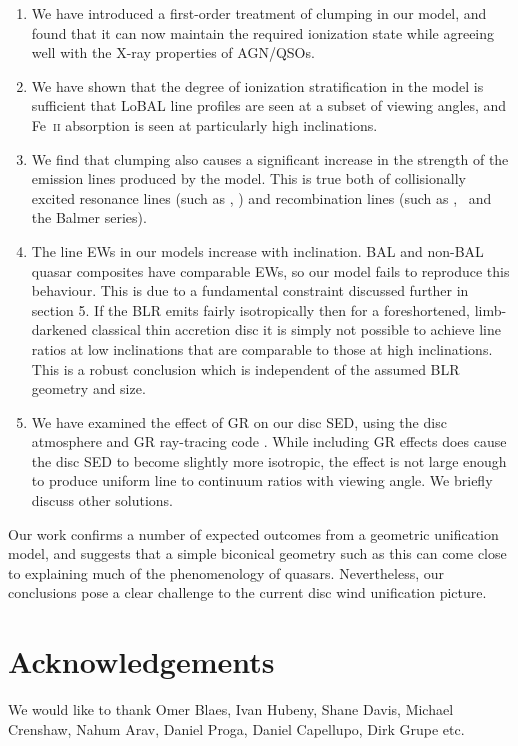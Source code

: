 \documentclass[preprint, a4paper, 11pt]{aastex}
\begin{document}
\begin{enumerate}
\item We have introduced a first-order treatment 
of clumping in our model, and found that it can now maintain
the required ionization state while agreeing well with the X-ray
properties of AGN/QSOs.
\smallskip
\item We have shown that the degree of ionization stratification
in the model is sufficient that LoBAL line profiles
are seen at a subset of viewing angles, and Fe~\textsc{ii}
absorption is seen at particularly high inclinations.
\smallskip
\item We find that clumping also causes a significant 
increase in the strength of the  emission
lines produced by the model. This is true both
of collisionally excited resonance lines (such as \civ, \nv)
and recombination lines (such as \la, \ha\ and the Balmer series).
\smallskip
\item The line EWs in our models increase with inclination.
BAL and non-BAL quasar composites have comparable EWs, so our model
fails to reproduce this behaviour.
This is due to a fundamental constraint discussed further in section 5. If the BLR
emits fairly isotropically then for a foreshortened, limb-darkened classical thin accretion disc
it is simply not possible to achieve line ratios at low inclinations that are comparable to
those at high inclinations. This is a robust conclusion which 
is independent of the assumed BLR geometry and size.
\smallskip
\item We have examined the effect of GR on our disc SED, using the disc atmosphere
and GR ray-tracing code \agn. While including GR effects
does cause the disc SED to become slightly more isotropic,
the effect is not large enough to produce uniform line to continuum ratios
with viewing angle. We briefly discuss other solutions.
\end{enumerate}
Our work confirms a number of expected outcomes from a geometric unification 
model, and suggests that a simple biconical geometry such as this can come close to 
explaining much of the  phenomenology of quasars. Nevertheless, our conclusions pose 
a clear challenge to the current disc wind unification picture.




\section*{Acknowledgements}

We would like to thank Omer Blaes, Ivan Hubeny, Shane Davis, 
Michael Crenshaw, Nahum Arav, Daniel Proga, Daniel Capellupo, Dirk Grupe etc.
\end{document}
